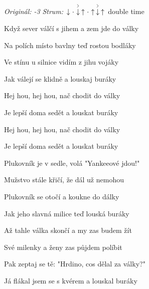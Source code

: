 \begin{song}


\begin{headerbox}
\RaiseBoxWithAccents
{} \quad
\textit{Originál: -3} \quad
\textit{Strum:} $\Down\Miss\AccentDown\Up\Miss\Up\AccentDown\Up$ double time \quad
\end{headerbox}

\begin{hchordbox}
\end{hchordbox}

\Large

\bigskip

Když sever válčí s jihem a zem jde do války \par
Na polích místo bavlny teď rostou bodláky \par
Ve stínu u silnice vidím z jihu vojáky \par
Jak válejí se klidně a louskaj buráky \par

\bigskip

\begin{chorusbox}{\Refren}
Hej hou, hej hou, nač chodit do války \par
Je lepší doma sedět a louskat buráky \par
Hej hou, hej hou, nač chodit do války \par
Je lepší doma sedět a louskat buráky \par
\end{chorusbox}

\bigskip

Plukovník je v sedle, volá "Yankeeové jdou!" \par
{}Mužstvo stále křičí, že dál už nemohou \par
{}Plukovník se otočí a koukne do dálky \par
Jak jeho slavná milice teď louská buráky \par

\bigskip

\Refren

\bigskip

Až tahle válka skončí a my zas budem žít \par
Své milenky a ženy zas půjdem políbit \par
Pak zeptaj se tě: "Hrdino, cos dělal za války?" \par
Já flákal jsem se s kvérem a louskal buráky \par

\bigskip

\Refren

\bigskip


\end{song}
